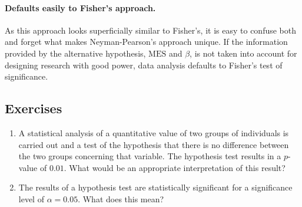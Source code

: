 \documentclass[
]{book}
\theoremstyle{definition}
\theoremstyle{definition}
\theoremstyle{definition}
\theoremstyle{definition}
\theoremstyle{remark}
\begin{document}
\hypertarget{defaults-easily-to-fishers-approach.}{%
\paragraph*{Defaults easily to Fisher's approach.}\label{defaults-easily-to-fishers-approach.}}

As this approach looks superficially similar to Fisher's, it is easy to confuse both and forget what makes Neyman-Pearson's approach unique. If the information provided by the alternative hypothesis, \(\mbox{MES}\) and \(\beta\), is not taken into account for designing research with good power, data analysis defaults to Fisher's test of significance.

\hypertarget{exercises-71}{%
\subsection{Exercises}\label{exercises-71}}

\begin{enumerate}
\def\labelenumi{\arabic{enumi}.}
\item
  A statistical analysis of a quantitative value of two groups of individuals is carried out and a test of the hypothesis that there is no difference between the two groups concerning that variable. The hypothesis test results in a \(p\)-value of \(0.01\). What would be an appropriate interpretation of this result?
\item
  The results of a hypothesis test are statistically significant for a significance level of \(\alpha=0.05\). What does this mean?
\end{enumerate}

  
\end{document}
